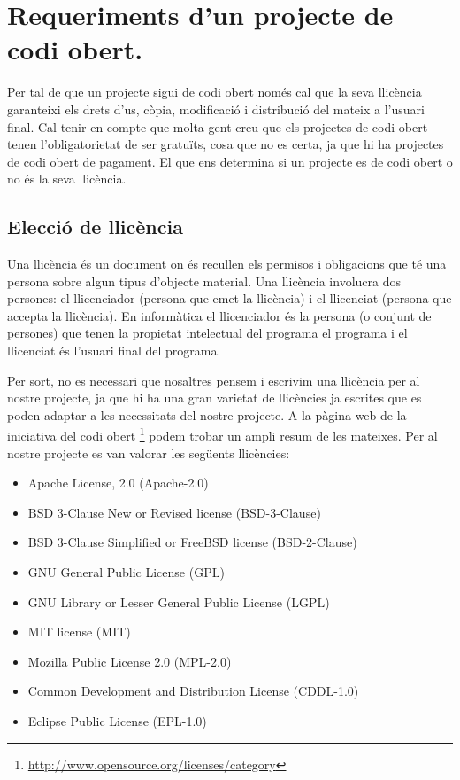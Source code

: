 \section{Requeriments d'un projecte de codi obert.}

Per tal de que un projecte sigui de codi obert només cal que la seva llicència garanteixi els drets  d'us, còpia,  modificació i distribució del mateix a l'usuari final. Cal tenir en compte que molta gent creu que els projectes de codi obert tenen l'obligatorietat de ser gratuïts, cosa que no es certa, ja que hi ha projectes de codi obert de pagament. El que ens determina si un projecte es de codi obert o no és la seva llicència. 

\subsection{Elecció de llicència}

Una llicència és un document on és recullen els permisos i obligacions que té una persona sobre algun tipus d'objecte material. Una llicència involucra dos persones: el llicenciador (persona que emet la llicència) i el llicenciat (persona que accepta la llicència). En informàtica el llicenciador és la persona (o conjunt de persones) que tenen la propietat intelectual del programa el programa i el llicenciat és l'usuari final del programa. 

Per sort, no es necessari que nosaltres pensem i escrivim una llicència per al nostre projecte, ja que hi ha una gran varietat de llicències ja escrites que es poden adaptar a les necessitats del nostre projecte. A la pàgina web de la iniciativa del codi obert \footnote{\url{http://www.opensource.org/licenses/category}} podem trobar un ampli resum de les mateixes. Per al nostre projecte es van valorar les següents llicències: 

\begin{itemize}
\item{Apache License, 2.0 (Apache-2.0)}
\item{BSD 3-Clause New or Revised license (BSD-3-Clause)}
\item{BSD 3-Clause Simplified or FreeBSD license (BSD-2-Clause)}
\item{GNU General Public License (GPL)}
\item{GNU Library or Lesser General Public License (LGPL)}
\item{MIT license (MIT)}
\item{Mozilla Public License 2.0 (MPL-2.0)}
\item{Common Development and Distribution License (CDDL-1.0)}
\item{Eclipse Public License (EPL-1.0)}
\end{itemize}


